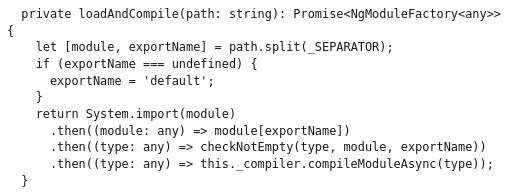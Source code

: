\begin{verbatim}
  private loadAndCompile(path: string): Promise<NgModuleFactory<any>> {
    let [module, exportName] = path.split(_SEPARATOR);
    if (exportName === undefined) {
      exportName = 'default';
    }
    return System.import(module)
      .then((module: any) => module[exportName])
      .then((type: any) => checkNotEmpty(type, module, exportName))
      .then((type: any) => this._compiler.compileModuleAsync(type));
  }
\end{verbatim}

